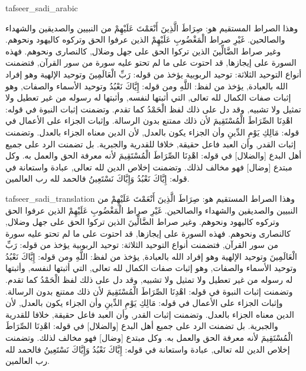 \begin{taggedblock}{tafseer_sadi_arabic}
\begin{Arabic}
وهذا الصراط المستقيم هو:
{ صِرَاطَ الَّذِينَ أَنْعَمْتَ عَلَيْهِمْ }
من النبيين والصديقين والشهداء والصالحين.
{ غَيْرِ }
صراط
{ الْمَغْضُوبِ عَلَيْهِمْ }
الذين عرفوا الحق وتركوه كاليهود ونحوهم. وغير صراط
{ الضَّالِّينَ }
الذين تركوا الحق على جهل وضلال, كالنصارى ونحوهم. فهذه السورة على إيجازها, قد احتوت على ما لم تحتو عليه سورة من سور القرآن, فتضمنت أنواع التوحيد الثلاثة: توحيد الربوبية يؤخذ من قوله:
{ رَبِّ الْعَالَمِينَ }
وتوحيد الإلهية وهو إفراد الله بالعبادة, يؤخذ من لفظ:
{ اللَّهِ }
ومن قوله:
{ إِيَّاكَ نَعْبُدُ }
وتوحيد الأسماء والصفات, وهو إثبات صفات الكمال لله تعالى, التي أثبتها لنفسه, وأثبتها له رسوله من غير تعطيل ولا تمثيل ولا تشبيه, وقد دل على ذلك لفظ
{ الْحَمْدُ }
كما تقدم. وتضمنت إثبات النبوة في قوله:
{ اهْدِنَا الصِّرَاطَ الْمُسْتَقِيمَ }
لأن ذلك ممتنع بدون الرسالة. وإثبات الجزاء على الأعمال في قوله:
{ مَالِكِ يَوْمِ الدِّينِ }
وأن الجزاء يكون بالعدل, لأن الدين معناه الجزاء بالعدل. وتضمنت إثبات القدر, وأن العبد فاعل حقيقة, خلافا للقدرية والجبرية. بل تضمنت الرد على جميع أهل البدع
[والضلال]
في قوله:
{ اهْدِنَا الصِّرَاطَ الْمُسْتَقِيمَ }
لأنه معرفة الحق والعمل به. وكل مبتدع
[وضال]
فهو مخالف لذلك. وتضمنت إخلاص الدين لله تعالى, عبادة واستعانة في قوله:
{ إِيَّاكَ نَعْبُدُ وَإِيَّاكَ نَسْتَعِينُ }
فالحمد لله رب العالمين.
\end{Arabic}
\end{taggedblock}
\begin{taggedblock}{tafseer_sadi_translation}
وهذا الصراط المستقيم هو:
{ صِرَاطَ الَّذِينَ أَنْعَمْتَ عَلَيْهِمْ }
من النبيين والصديقين والشهداء والصالحين.
{ غَيْرِ }
صراط
{ الْمَغْضُوبِ عَلَيْهِمْ }
الذين عرفوا الحق وتركوه كاليهود ونحوهم. وغير صراط
{ الضَّالِّينَ }
الذين تركوا الحق على جهل وضلال, كالنصارى ونحوهم. فهذه السورة على إيجازها, قد احتوت على ما لم تحتو عليه سورة من سور القرآن, فتضمنت أنواع التوحيد الثلاثة: توحيد الربوبية يؤخذ من قوله:
{ رَبِّ الْعَالَمِينَ }
وتوحيد الإلهية وهو إفراد الله بالعبادة, يؤخذ من لفظ:
{ اللَّهِ }
ومن قوله:
{ إِيَّاكَ نَعْبُدُ }
وتوحيد الأسماء والصفات, وهو إثبات صفات الكمال لله تعالى, التي أثبتها لنفسه, وأثبتها له رسوله من غير تعطيل ولا تمثيل ولا تشبيه, وقد دل على ذلك لفظ
{ الْحَمْدُ }
كما تقدم. وتضمنت إثبات النبوة في قوله:
{ اهْدِنَا الصِّرَاطَ الْمُسْتَقِيمَ }
لأن ذلك ممتنع بدون الرسالة. وإثبات الجزاء على الأعمال في قوله:
{ مَالِكِ يَوْمِ الدِّينِ }
وأن الجزاء يكون بالعدل, لأن الدين معناه الجزاء بالعدل. وتضمنت إثبات القدر, وأن العبد فاعل حقيقة, خلافا للقدرية والجبرية. بل تضمنت الرد على جميع أهل البدع
[والضلال]
في قوله:
{ اهْدِنَا الصِّرَاطَ الْمُسْتَقِيمَ }
لأنه معرفة الحق والعمل به. وكل مبتدع
[وضال]
فهو مخالف لذلك. وتضمنت إخلاص الدين لله تعالى, عبادة واستعانة في قوله:
{ إِيَّاكَ نَعْبُدُ وَإِيَّاكَ نَسْتَعِينُ }
فالحمد لله رب العالمين.
\end{taggedblock}
